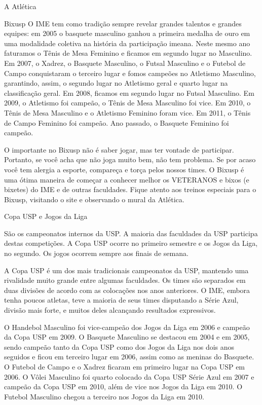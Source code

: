 \begin{secao}{A Atlética}
\begin{subsecao}{Bixusp}
O IME tem como tradição sempre revelar grandes talentos e grandes equipes: em
2005 o basquete masculino ganhou a primeira medalha de ouro em uma modalidade
coletiva na história da participação imeana. Neste mesmo ano faturamos o Tênis
de Mesa Feminino e ficamos em segundo lugar no Masculino. Em 2007, o Xadrez, o 
Basquete Masculino, o Futsal Masculino e o Futebol de Campo conquistaram o 
terceiro lugar e fomos campeões no Atletismo Masculino, garantindo, assim, o 
segundo lugar no Atletismo geral e quarto lugar na classificação geral. Em 2008,
ficamos em segundo lugar no Futsal Masculino. Em 2009, o Atletismo foi campeão, 
o Tênis de Mesa Masculino foi vice. Em 2010, o Tênis de Mesa Masculino e o 
Atletismo Feminino foram vice. Em 2011, o Tênis de Campo Feminino foi campeão. 
Ano passado, o Basquete Feminino foi campeão.

O importante no Bixusp não é saber jogar, mas ter vontade de participar.
Portanto, se você acha que não joga muito bem, não tem problema. Se por acaso
você tem alergia a esporte, compareça e torça pelos nossos times. O Bixusp é uma
ótima maneira de começar a conhecer melhor os VETERANOS e bixos (e bixetes) do
IME e de outras faculdades. Fique atento aos treinos especiais para o Bixusp, 
visitando o site e observando o mural da Atlética.

\end{subsecao}
\begin{subsecao}{Copa USP e Jogos da Liga}

São os campeonatos internos da USP. A maioria das faculdades da USP participa
destas competições. A Copa USP ocorre no primeiro semestre e os Jogos da Liga,
no segundo. Os jogos ocorrem sempre aos finais de semana.

A Copa USP é um dos mais tradicionais campeonatos da USP, mantendo uma
rivalidade muito grande entre algumas faculdades. Os times são separados em
duas divisões de acordo com as colocações nos anos anteriores. O IME, embora
tenha poucos atletas, teve a maioria de seus times disputando a Série Azul,
divisão mais forte, e muitos deles alcançando resultados expressivos.

O Handebol Masculino foi vice-campeão dos Jogos da Liga em 2006 e campeão da
Copa USP em 2009. O Basquete Masculino se destacou em 2004 e em 2005, sendo
campeão tanto da Copa USP como dos Jogos da Liga nos dois anos seguidos e ficou
em terceiro lugar em 2006, assim como as meninas do Basquete. O Futebol de
Campo e o Xadrez ficaram em primeiro lugar na Copa USP em 2006. O Vôlei
Masculino foi quarto colocado da Copa USP Série Azul em 2007 e campeão da Copa
USP em 2010, além de vice nos Jogos da Liga em 2010. O Futebol Masculino chegou
a terceiro nos Jogos da Liga em 2010.


\end{subsecao}
\end{secao}
